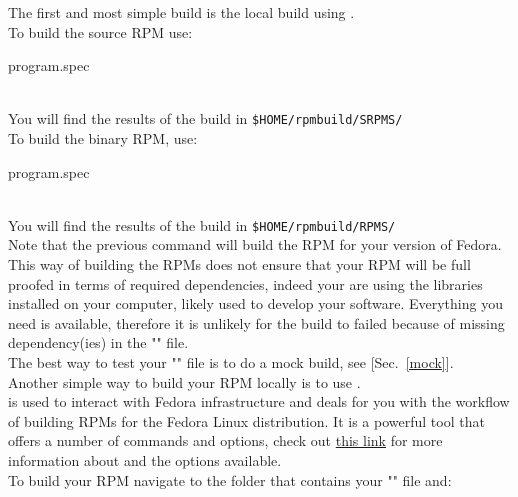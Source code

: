 The first and most simple build is the local build using . \\[0.25cm]
To build the source RPM use: 
\begin{script}
\fprompt{~}   program.spec
\end{script}
\\[-0.75cm]
\noindent You will find the results of the build in \texttt{\$HOME/rpmbuild/SRPMS/}\\[0.25cm] 
To build the binary RPM, use:
\begin{script}
\fprompt{~}   program.spec
\end{script}
\\[-0.75cm]
\noindent You will find the results of the build in \texttt{\$HOME/rpmbuild/RPMS/} \\[0.25cm]
Note that the previous command will build the RPM for your version of Fedora. \\[0.25cm]
This way of building the RPMs does not ensure that your RPM will be full proofed in terms of required dependencies, 
indeed your are using the libraries installed on your computer, likely used to develop your software. 
Everything you need is available, therefore it is unlikely for the build to failed because of missing dependency(ies) in the "" file. \\ 
The best way to test your  "" file is to do a mock build, see [Sec.~\ref{mock}]. \\[0.25cm]
\clearpage
\noindent Another simple way to build your RPM locally is to use . \\
 is used to interact with Fedora infrastructure and deals for you with the workflow of building RPMs for the Fedora Linux distribution. 
It is a powerful tool that offers a number of commands and options, check out \href{https://docs.fedoraproject.org/en-US/package-maintainers/Package\_Maintenance\_Guide/#common\_fedpkg\_commands}{this link} for more information about  and the options available. \\[0.25cm] 
To build your RPM navigate to the folder that contains your "" file and:
